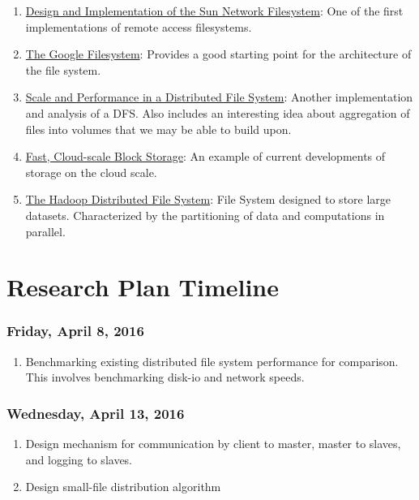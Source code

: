 \documentclass{article}
\begin{document}
\begin{enumerate}
\item \href{https://www.eecs.harvard.edu/cs261/papers/sandberg85.pdf}{Design and Implementation of the Sun Network Filesystem}: One of the first implementations of remote access filesystems. 
\item \href{http://www.cs.duke.edu/courses/spring16/compsci510/resources/papers/gfs-sosp2003.pdf}{The Google Filesystem}: Provides a good starting point for the architecture of the file system. 
\item \href{https://www.eecs.harvard.edu/cs261/papers/afs.pdf}{Scale and Performance in a Distributed File System}: Another implementation and analysis of a DFS. Also includes an interesting idea about aggregation of files into volumes that we may be able to build upon.
\item \href{https://www.eecs.harvard.edu/cs261/papers/sandberg85.pdf}{Fast, Cloud-scale Block Storage}: An example of current developments of storage on the cloud scale.
\item \href{http://storageconference.us/2010/Papers/MSST/Shvachko.pdf}{The Hadoop Distributed File System}: File System designed to store large datasets. Characterized by the partitioning of data and computations in parallel.
\end{enumerate}

\section{Research Plan Timeline}
\subsubsection*{Friday, April 8, 2016}
\begin{enumerate}
\item Benchmarking existing distributed file system performance for comparison. This involves benchmarking disk-io and network speeds. 
\end{enumerate}

\subsubsection*{Wednesday, April 13, 2016}
\begin{enumerate}
\item Design mechanism for communication by client to master, master to slaves, and logging to slaves. 
\item Design small-file distribution algorithm
\end{enumerate}
\end{document}
